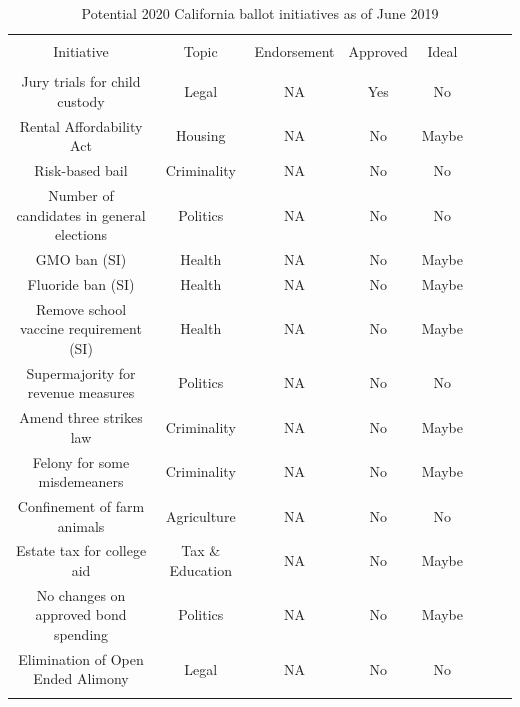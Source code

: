 \documentclass[12pt,final,fleqn]{article}
\theoremstyle{plain}
\begin{document}
\begin{table}[!htbp] \centering 
  \caption{Potential 2020 California ballot initiatives as of June 2019}
  \label{tab: initiatives} 
  \small
\begin{tabular}{@{\extracolsep{0pt}} cccccccc} 
\\[-1.8ex]\hline 
\hline \\[-1.8ex] 
 Initiative & Topic & Endorsement & Approved & Ideal \\ 
\hline \\[-1.8ex] 
Jury trials for child custody & Legal & NA & Yes & No \\
Rental Affordability Act & Housing & NA & No & Maybe \\
Risk-based bail & Criminality & NA & No & No \\
Number of candidates in general elections & Politics & NA & No & No \\
GMO ban (SI) & Health & NA & No & Maybe \\
Fluoride ban (SI) & Health & NA & No & Maybe \\
Remove school vaccine requirement (SI) & Health & NA & No & Maybe \\
Supermajority for revenue measures & Politics & NA & No & No \\
Amend three strikes law & Criminality & NA & No & Maybe \\
Felony for some misdemeaners & Criminality & NA & No & Maybe \\
Confinement of farm animals & Agriculture & NA & No & No \\
Estate tax for college aid & Tax \& Education & NA & No & Maybe \\
No changes on approved bond spending & Politics & NA & No & Maybe \\
Elimination of Open Ended Alimony & Legal & NA & No & No \\
\hline \\[-1.8ex] 
\end{tabular} 
\end{table} 
\FloatBarrier
\end{document}
